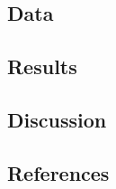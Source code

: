 \documentclass[
  letterpaper,
  DIV=11,
  numbers=noendperiod]{scrartcl}
\begin{document}
\subsection{Data}\label{data}

\subsection{Results}\label{results}

\subsection{Discussion}\label{discussion}

\subsection*{References}\label{references}
\end{document}
